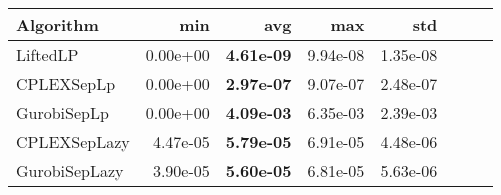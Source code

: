 \begin{tabular}{lrrrrrrr}
Algorithm & min & avg & max & std
\\
\hline
LiftedLP&0.00e+00& \bf4.61e-09& 9.94e-08& 1.35e-08\\
CPLEXSepLp&0.00e+00& \bf2.97e-07& 9.07e-07& 2.48e-07\\
GurobiSepLp&0.00e+00& \bf4.09e-03& 6.35e-03& 2.39e-03\\
CPLEXSepLazy&4.47e-05& \bf5.79e-05& 6.91e-05& 4.48e-06\\
GurobiSepLazy&3.90e-05& \bf5.60e-05& 6.81e-05& 5.63e-06
\end{tabular}
